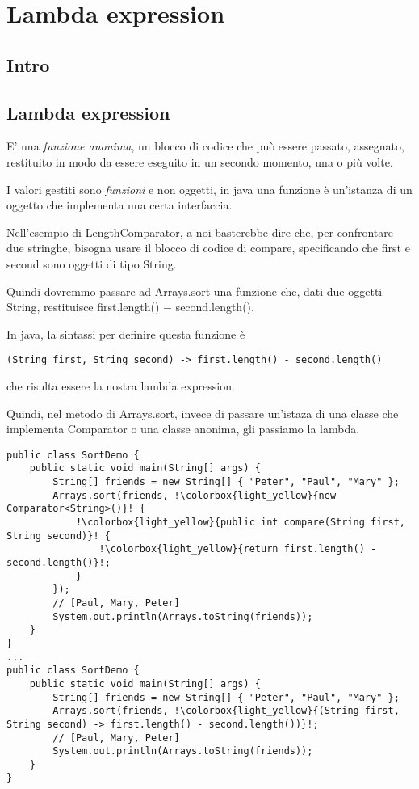 \chapter{Lambda expression}

\section{Intro}


\section{Lambda expression}
E' una \textit{funzione anonima}, un blocco di codice che può essere passato, assegnato, restituito in modo da essere eseguito in un secondo momento, una o più volte.

I valori gestiti sono \textit{funzioni} e non oggetti, in java una funzione è un'istanza di un oggetto che implementa una certa interfaccia.

Nell'esempio di LengthComparator, a noi basterebbe dire che, per confrontare due stringhe, bisogna usare il blocco di codice di compare, specificando che first e 
second sono oggetti di tipo String.

Quindi dovremmo passare ad Arrays.sort una funzione che, dati due oggetti String, restituisce \newline first.length() $-$ second.length().

In java, la sintassi per definire questa funzione è

\begin{lstlisting}
(String first, String second) -> first.length() - second.length()
\end{lstlisting}

che risulta essere la nostra lambda expression.

Quindi, nel metodo di Arrays.sort, invece di passare un'istaza di una classe che implementa Comparator o una classe anonima, gli passiamo la lambda.
\begin{lstlisting}[escapechar=!]
public class SortDemo {
    public static void main(String[] args) {
        String[] friends = new String[] { "Peter", "Paul", "Mary" };
        Arrays.sort(friends, !\colorbox{light_yellow}{new Comparator<String>()}! { 
            !\colorbox{light_yellow}{public int compare(String first, String second)}! {
                !\colorbox{light_yellow}{return first.length() - second.length()}!;
            }
        });
        // [Paul, Mary, Peter]
        System.out.println(Arrays.toString(friends));
    }
}
... 
public class SortDemo {
    public static void main(String[] args) {
        String[] friends = new String[] { "Peter", "Paul", "Mary" };
        Arrays.sort(friends, !\colorbox{light_yellow}{(String first, String second) -> first.length() - second.length())}!;
        // [Paul, Mary, Peter]
        System.out.println(Arrays.toString(friends));
    }
} 
\end{lstlisting}

